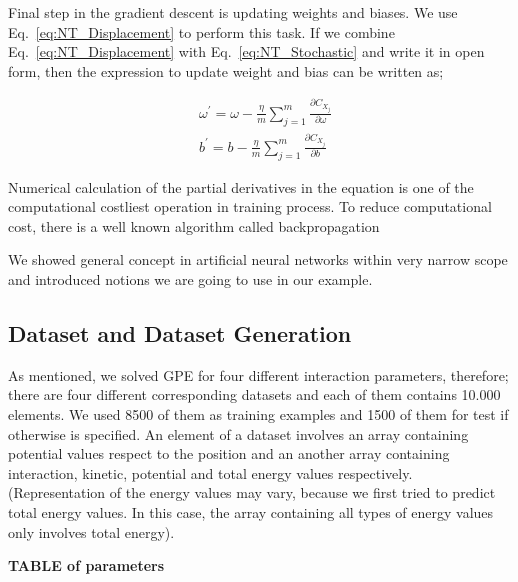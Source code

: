 \documentclass[a4paper,times,12pt]{article}
\begin{document}
Final step in the gradient descent is updating weights and biases. We use Eq.~\ref{eq:NT_Displacement} to perform this task. If we combine Eq.~\ref{eq:NT_Displacement} with Eq.~\ref{eq:NT_Stochastic} and write it in open form, then the expression to update weight and bias can be written as;

\begin{equation}
\label{eq:NT_weight_bias_update}
\begin{split}
& \omega^{\prime} = \omega - \frac{\eta}{m} \sum\limits_{j = 1}^{m} \frac{\partial{C_{X_j}}}{\partial{\omega}} \\
& b^{\prime} = b- \frac{\eta}{m} \sum\limits_{j = 1}^{m} \frac{\partial{C_{X_j}}}{\partial{b}}
\end{split}
\end{equation}

\noindent Numerical calculation of the partial derivatives in the equation is one of the computational costliest operation in training process. To reduce computational cost, there is a well known algorithm called backpropagation \cite{goodfellow2016deep}

We showed general concept in artificial neural networks within very narrow scope and introduced notions we are going to use in our example. 


\subsection{Dataset and Dataset Generation}

As mentioned, we solved GPE for four different interaction parameters, therefore; there are four different corresponding datasets and each of them contains 10.000 elements. We used 8500 of them as training examples and 1500 of them for test if otherwise is specified. An element of a dataset involves an array containing potential values respect to the position and an another array containing interaction, kinetic, potential and total energy values respectively. (Representation of the energy values may vary, because we first tried to predict total energy values. In this case, the array containing all types of energy values only involves total energy).

\textbf{TABLE of parameters}
\end{document}
